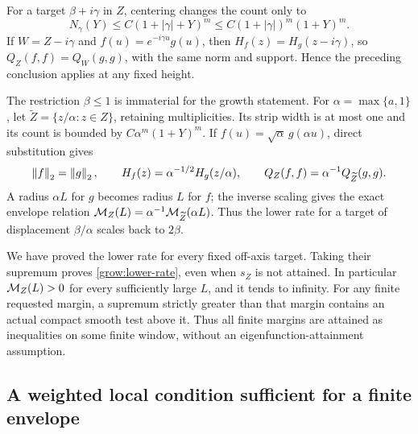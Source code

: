 For a target \(\beta+i\gamma\) in \(Z\), centering changes the
count only to
\begin{equation}\label{grow:shifted-count}
 N_\gamma(Y)\le C(1+|\gamma|+Y)^m
       \le C(1+|\gamma|)^m(1+Y)^m.
\end{equation}
If \(W=Z-i\gamma\) and \(f(u)=e^{-i\gamma u}g(u)\), then
\(H_f(z)=H_g(z-i\gamma)\), so
\(Q_Z(f,f)=Q_W(g,g)\), with the same norm and support. Hence
the preceding conclusion applies at any fixed height.

The restriction \(\beta\le1\) is immaterial for the growth
statement. For \(\alpha=\max\{a,1\}\), let
\(\widetilde Z=\{z/\alpha:z\in Z\}\), retaining multiplicities.
Its strip width is at most one and its count is bounded by
\(C\alpha^m(1+Y)^m\). If
\(f(u)=\sqrt\alpha\,g(\alpha u)\), direct substitution gives
\begin{equation}\label{grow:dilation}
 \left\|f\right\|_2=\left\|g\right\|_2,\qquad
 H_f(z)=\alpha^{-1/2}H_g(z/\alpha),\qquad
 Q_Z(f,f)=\alpha^{-1}Q_{\widetilde Z}(g,g).
\end{equation}
A radius \(\alpha L\) for \(g\) becomes radius \(L\) for
\(f\); the inverse scaling gives the exact envelope relation
\(\mathcal M_Z(L)=\alpha^{-1}\mathcal M_{\widetilde Z}(\alpha L)\).
Thus the lower rate for a target of displacement
\(\beta/\alpha\) scales back to \(2\beta\).

We have proved the lower rate for every fixed off-axis target.
Taking their supremum proves \eqref{grow:lower-rate}, even when
\(s_Z\) is not attained. In particular \(\mathcal M_Z(L)>0\) for
every sufficiently large \(L\), and it tends to infinity.
For any finite requested margin, a supremum strictly greater than
that margin contains an actual compact smooth test above it. Thus
all finite margins are attained as inequalities on some finite
window, without an eigenfunction-attainment assumption.

\subsection{A weighted local condition sufficient for a finite envelope}

